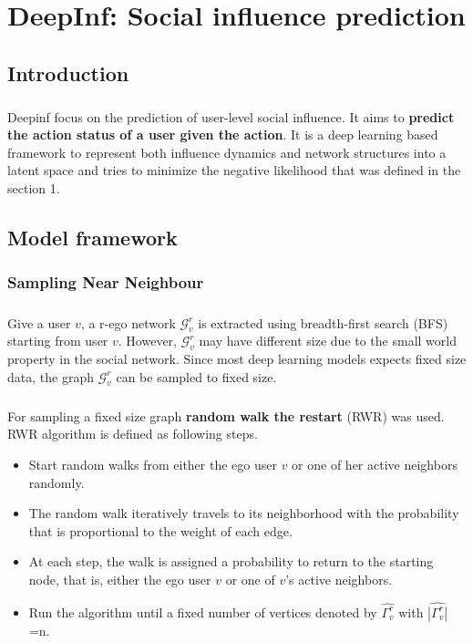 \chapter{DeepInf: Social influence prediction}


\section{Introduction}
\paragraph{} Deepinf focus on the prediction of user-level social influence. It aims to \textbf{predict the action status of a user given the action}.
It is a deep learning based framework to represent both influence dynamics and network structures into a latent space and 
tries to minimize the negative likelihood that was defined in the section 1.


\section{Model framework}
\subsection{Sampling Near Neighbour}

\paragraph{} Give a user $v$, a r-ego network $\mathcal{G}_v^r$ is extracted using breadth-first search (BFS) starting from 
user $v$. However, $\mathcal{G}_v^r$ may have different size due to the small world property in the social network. Since most
deep learning models expects fixed size data, the graph $\mathcal{G}_v^r$ can be sampled to fixed size.
\paragraph{} For sampling a fixed size graph \textbf{random walk the restart} (RWR) was used. RWR algorithm is defined as
following steps.

\begin{itemize}
    \item Start random walks from either the ego user $v$ or one of her active neighbors randomly.
    \item The random walk iteratively travels to its neighborhood with the probability that is 
    proportional to the weight of each edge.
    \item At each step, the walk is assigned a probability to return to the starting node, that is, 
    either the ego user $v$ or one of $v$’s active neighbors.
    \item Run the algorithm until a fixed number of vertices denoted by $\hat{\Gamma_v^r}$ with $\hat{|\Gamma_v^r|}$=n. 
\end{itemize}

